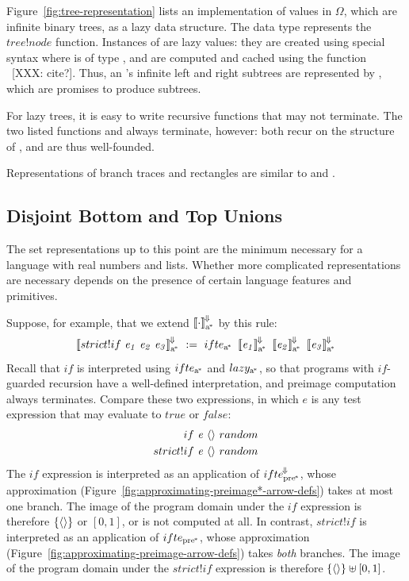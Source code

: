Figure~\ref{fig:tree-representation} lists an implementation of values in $\Omega$, which are infinite binary trees, as a lazy data structure.
The  data type represents the $tree!node$ function.
Instances of  are lazy values: they are created using special syntax  where  is of type , and are computed and cached using the function ~[XXX: cite?].
Thus, an 's infinite left and right subtrees are represented by , which are promises to produce subtrees.

For lazy trees, it is easy to write recursive functions that may not terminate.
The two listed functions  and  always terminate, however: both recur on the structure of , and are thus well-founded.

Representations of branch traces and rectangles are similar to  and .

\subsection{Disjoint Bottom and Top Unions}

The set representations up to this point are the minimum necessary for a language with real numbers and lists.
Whether more complicated representations are necessary depends on the presence of certain language features and primitives.

Suppose, for example, that we extend $\left\llbracket{\cdot}\right\rrbracket^{\mspace{-2mu}\Downarrow\mspace{-2mu}}_\mathrm{a^{\mspace{-2mu}*}}$ by this rule:
\begin{equation}
	\meaningofconv{strict!if~\mathit{e_1}~\mathit{e_2}~\mathit{e_3}}\genc\ :=\ 
		\arrowif\genc
			~\meaningofconv{\mathit{e_1}}\genc
			~\meaningofconv{\mathit{e_2}}\genc
			~\meaningofconv{\mathit{e_3}}\genc
\end{equation}
Recall that $if$ is interpreted using $ifte_\mathrm{a^{\mspace{-2mu}*}}$ and $lazy_\mathrm{a^{\mspace{-2mu}*}}$, so that programs with $if$-guarded recursion have a well-defined interpretation, and preimage computation always terminates.
Compare these two expressions, in which $\mathit{e}$ is any test expression that may evaluate to $true$ or $false$:
\begin{equation}
\begin{aligned}
	if~&\mathit{e}~\langle{}\rangle~random \\
	strict!if~&\mathit{e}~\langle{}\rangle~random \\
\end{aligned}
\end{equation}
The $if$ expression is interpreted as an application of $ifte^{\mspace{-2mu}\Downarrow\mspace{-2mu}}_\mathrm{pre^{\mspace{-2mu}*}}$, whose approximation (Figure~\ref{fig:approximating-preimage*-arrow-defs}) takes at most one branch.
The image of the program domain under the $if$ expression is therefore $\{{\langle{}\rangle}\}$ or $[0,1]$, or is not computed at all.
In contrast, $strict!if$ is interpreted as an application of $ifte_\mathrm{pre^{\mspace{-2mu}*}}$, whose approximation (Figure~\ref{fig:approximating-preimage-arrow-defs}) takes \emph{both} branches.
The image of the program domain under the $strict!if$ expression is therefore $\{{\langle{}\rangle}\} \uplus [0,1]$.

